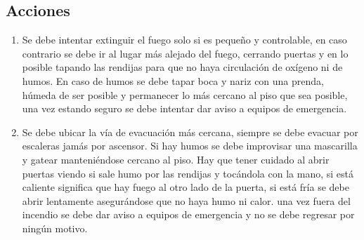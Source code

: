 \subsection{Acciones}
\begin{enumerate}[resume]
     \item  Se debe intentar extinguir el fuego solo si es pequeño y controlable, en caso contrario se debe ir al lugar más alejado del fuego, cerrando puertas y en lo posible tapando las rendijas para que no haya circulación de oxígeno ni de humos. En caso de humos se debe tapar boca y nariz con una prenda, húmeda de ser posible y permanecer lo más cercano al piso que sea posible, una vez estando seguro se debe intentar dar aviso a equipos de emergencia.

     \item Se debe ubicar la vía de evacuación más cercana, siempre se debe evacuar por escaleras jamás por ascensor. Si hay humos se debe improvisar una mascarilla y gatear manteniéndose cercano al piso. Hay que tener cuidado al abrir puertas viendo si sale humo por las rendijas y tocándola con la mano, si está caliente significa que hay fuego al otro lado de la puerta, si está fría se debe abrir lentamente asegurándose que no haya humo ni calor. una vez fuera del incendio se debe dar aviso  a equipos de emergencia y no se debe regresar por ningún motivo.
\end{enumerate}
